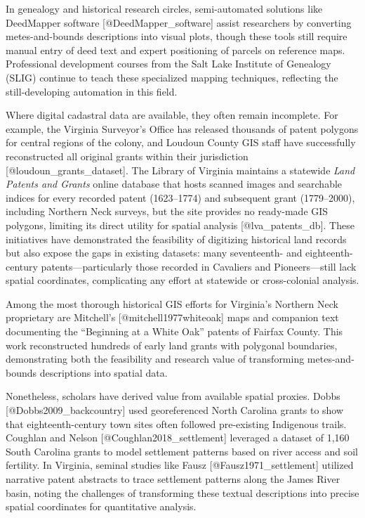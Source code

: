 \documentclass[
  11pt,
]{article}
\begin{document}
In genealogy and historical research circles, semi-automated solutions
like DeedMapper software {[}@DeedMapper\_software{]} assist researchers
by converting metes-and-bounds descriptions into visual plots, though
these tools still require manual entry of deed text and expert
positioning of parcels on reference maps. Professional development
courses from the Salt Lake Institute of Genealogy (SLIG) continue to
teach these specialized mapping techniques, reflecting the
still-developing automation in this field.

Where digital cadastral data are available, they often remain
incomplete. For example, the Virginia Surveyor's Office has released
thousands of patent polygons for central regions of the colony, and
Loudoun County GIS staff have successfully reconstructed all original
grants within their jurisdiction {[}@loudoun\_grants\_dataset{]}. The
Library of Virginia maintains a statewide \emph{Land Patents and Grants}
online database that hosts scanned images and searchable indices for
every recorded patent (1623--1774) and subsequent grant (1779--2000),
including Northern Neck surveys, but the site provides no ready-made GIS
polygons, limiting its direct utility for spatial analysis
{[}@lva\_patents\_db{]}. These initiatives have demonstrated the
feasibility of digitizing historical land records but also expose the
gaps in existing datasets: many seventeenth- and eighteenth-century
patents---particularly those recorded in Cavaliers and Pioneers---still
lack spatial coordinates, complicating any effort at statewide or
cross-colonial analysis.

Among the most thorough historical GIS efforts for Virginia's Northern
Neck proprietary are Mitchell's {[}@mitchell1977whiteoak{]} maps and
companion text documenting the ``Beginning at a White Oak'' patents of
Fairfax County. This work reconstructed hundreds of early land grants
with polygonal boundaries, demonstrating both the feasibility and
research value of transforming metes-and-bounds descriptions into
spatial data.

Nonetheless, scholars have derived value from available spatial proxies.
Dobbs {[}@Dobbs2009\_backcountry{]} used georeferenced North Carolina
grants to show that eighteenth-century town sites often followed
pre-existing Indigenous trails. Coughlan and Nelson
{[}@Coughlan2018\_settlement{]} leveraged a dataset of 1,160 South
Carolina grants to model settlement patterns based on river access and
soil fertility. In Virginia, seminal studies like Fausz
{[}@Fausz1971\_settlement{]} utilized narrative patent abstracts to
trace settlement patterns along the James River basin, noting the
challenges of transforming these textual descriptions into precise
spatial coordinates for quantitative analysis.
\end{document}
